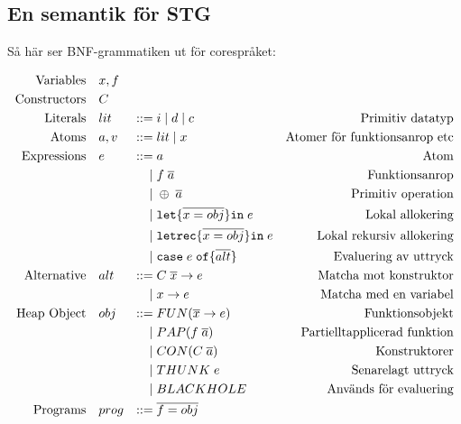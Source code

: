 \documentclass[../Core]{subfiles}
\begin{document}
\subsection{En semantik för STG}
\label{sec:SemStg}






Så här ser BNF-grammatiken ut för corespråket:


\begin{equation*}
\begin{aligned}
\text{Variables} \quad & x,f \\
\text{Constructors} \quad & C \\
\text{Literals}\quad&lit&::=&\;i \; | \;  d \;|\; c&\text{Primitiv datatyp} \\
\text{Atoms}\quad&a, v&::=&\;lit \; | \; x&\text{Atomer för funktionsanrop etc} \\
\text{Expressions}\quad&e&::=&\;a&\text{Atom} \\
    &&|&\;f \; \overline{a}&\text{Funktionsanrop} \\
    &&|&\;\oplus \; \overline{a}&\text{Primitiv operation} \\
    &&|&\;\mathtt{let \{} \overline{x = obj} \mathtt{ \} in } \; e&\text{Lokal allokering} \\
    &&|&\;\mathtt{letrec \{} \overline{x = obj} \mathtt{ \} in } \; e&\text{Lokal rekursiv allokering} \\
    &&|&\;\mathtt{case} \; e \;  \mathtt{ of \{ } \overline{alt} \mathtt{\}}&\text{Evaluering av uttryck} \\
\text{Alternative}\quad&alt&::=&\;C \; \overline{x} \rightarrow e&\text{Matcha mot konstruktor} \\
    &&|&\;x \rightarrow e&\text{Matcha med en variabel} \\
\text{Heap Object}\quad&obj&::=&\;FUN(\overline{x} \rightarrow e)&\text{Funktionsobjekt} \\
    &&|&\;PAP(f \; \overline{a})&\text{Partielltapplicerad funktion} \\
    &&|&\;CON(C \; \overline{a})&\text{Konstruktorer} \\
    &&|&\;THUNK \; e&\text{Senarelagt uttryck} \\
    &&|&\;BLACKHOLE&\text{Används för evaluering} \\
\text{Programs}\quad&prog&::=&\;\overline{f=obj}&\text{}
\end{aligned}
\end{equation*}
\end{document}

